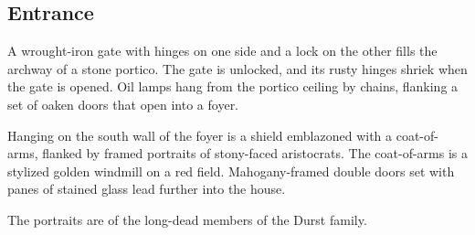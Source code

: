 \subsection{Entrance}
\label{sec:Entrance}
\begin{readout}
  A wrought-iron gate with hinges on one side and a lock on the other fills the archway of a stone portico.
  The gate is unlocked, and its rusty hinges shriek when the gate is opened. Oil lamps hang from the portico
  ceiling by chains, flanking a set of oaken doors that open into a foyer.
  
  Hanging on the south wall of the foyer is a shield emblazoned with a coat-of-arms, flanked by framed portraits 
  of stony-faced aristocrats. The coat-of-arms is a stylized golden windmill on a red field. Mahogany-framed 
  double doors set with panes of stained glass lead further into the house.
\end{readout}
The portraits are of the long-dead members of the Durst family.
\begin{arealinks}
\end{arealinks}


